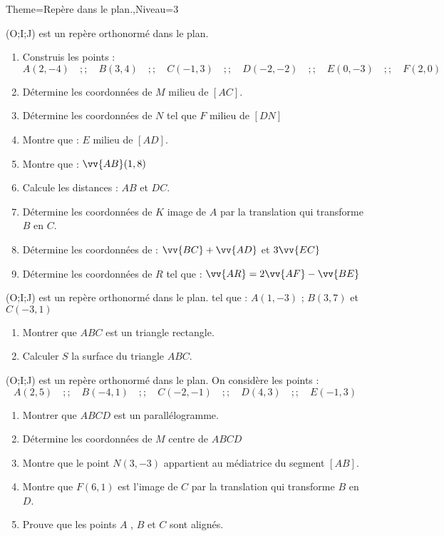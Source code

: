 \documentclass[a4paper,12pt]{article}
\begin{document}
\begin{Maquette}[Fiche]{Theme=Repère dans le plan.,Niveau=3}

\begin{exercice}
(O;I;J) est un repère orthonormé dans le plan.
\begin{enumerate}
\item Construis les points : 
\[
A(2,-4)\quad ;;\quad B(3,4)\quad ;;\quad C(-1,3)\quad ;;\quad D(-2,-2)\quad ;;\quad E(0,-3)\quad ;;\quad F(2,0)
\]
\item Détermine les coordonnées de $M$ milieu de $[AC]$.
\item Détermine les coordonnées de $N$ tel que $F$ milieu de $[DN]$
\item Montre que : $E$ milieu de $[AD]$.
\item Montre que : $\vv{AB}(1,8)$
\item Calcule les distances : $AB$ et $DC$.
\item Détermine les coordonnées de $K$ image de $A$ par la translation qui transforme $B$ en $C$.
\item Détermine les coordonnées de : $\vv{BC}+\vv{AD}$ et $3\vv{EC}$
\item Détermine les coordonnées de $R$ tel que : $\vv{AR}=2\vv{AF}-\vv{BE}$
\end{enumerate}
\end{exercice}

\begin{exercice}
(O;I;J) est un repère orthonormé dans le plan.
tel que : $A(1,-3)$ ; $ B(3,7) $ et $  C(-3,1)$
\begin{enumerate}
\item Montrer que $ABC$ est un triangle rectangle.
\item Calculer $S$ la surface du triangle $ABC$.
\end{enumerate}
\end{exercice}

\begin{exercice}
(O;I;J) est un repère orthonormé dans le plan. On considère les points :
\[
A(2,5)\quad ;;\quad B(-4,1)\quad ;;\quad C(-2,-1)\quad ;;\quad D(4,3)\quad ;;\quad E(-1,3)
\]
\begin{enumerate}
\item Montrer que $ABCD$ est un parallélogramme.
\item Détermine les coordonnées de $M$ centre de $ABCD$
\item Montre que le point $N(3,-3)$ appartient au médiatrice du segment $[AB]$.
\item Montre que $F(6,1)$ est l'image de $C$ par la translation qui transforme $B$ en $D$.
\item Prouve que les points $A$ , $B$ et $C$  sont alignés.
\end{enumerate}
\end{exercice}


\end{Maquette}
\end{document}
